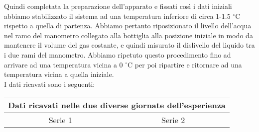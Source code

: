 Quindi completata la preparazione dell'apparato e fissati così i dati iniziali abbiamo stabilizzato il sistema ad una temperatura inferiore di circa 1-1.5 $^\circ$C rispetto a quella di partenza. Abbiamo pertanto riposizionato il livello dell'acqua nel ramo del manometro collegato alla bottiglia alla posizione iniziale in modo da mantenere il volume del gas costante, e quindi misurato il dislivello del liquido tra i due rami del manometro.
Abbiamo ripetuto questo procedimento fino ad arrivare ad una temperatura vicina a 0 $^\circ$C per poi ripartire e ritornare ad una temperatura vicina a quella iniziale.\\

I dati ricavati sono i seguenti:

\begin{table}
    \centering
    \begin{tabular}{c c c | c c c}
        \toprule
        \multicolumn{6}{c}{Dati ricavati nelle due diverse giornate dell'esperienza} \\
        \midrule
        \multicolumn{3}{c}{Serie 1} & \multicolumn{3}{c}{Serie 2} \\


\end{tabular}
\end{table}
